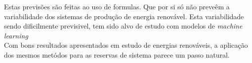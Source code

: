 Estas previsões são feitas ao uso de formulas. Que por si só não preveêm a variabilidade dos sistemas de produção de energia renovável. Esta variabilidade sendo dificilmente previsivel, tem sido alvo de estudo com modelos de \textit{machine learning} \cite{} \\
Com bons resultados apresentados em estudo de energias renováveis, a aplicação dos mesmos metódos para as reservas de sistema parece um passo natural. \\




